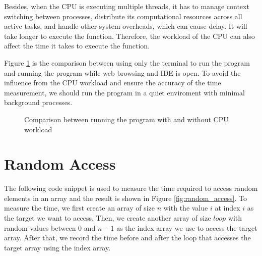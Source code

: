 \documentclass[a4paper,11pt]{article}
\begin{document}
Besides, when the CPU is executing multiple threads, it has to manage context switching between processes, 
distribute its computational resources across all active tasks, and handle other system overheads, which can cause delay.
It will take longer to execute the function. Therefore, the workload of the CPU can also affect the time it takes to 
execute the function.

Figure \ref{fig:clock_accuracy_busy} is the comparison between using only the terminal to run the program and running the program while 
web browsing and IDE is open. To avoid the influence from the CPU workload and ensure the accuracy of the 
time measurement, we should run the program in a quiet enviroment with minimal background processes.

\begin{figure}[H]
  \centering
  \caption{Comparison between running the program with and without CPU workload}
  \label{fig:clock_accuracy_busy}
\end{figure}

\section*{Random Access}

The following code snippet is used to measure the time required to access random
elements in an array and the result is shown in Figure \ref{fig:random_access}.
To measure the time, we first create an array of size $n$ with the value $i$ at index $i$ as the 
target we want to access. Then, we create another array of size $loop$ with random values between 
0 and $n-1$ as the index array we use to access the target array. After that, we record the time 
before and after the loop that accesses the target array using the index array. 
\end{document}

